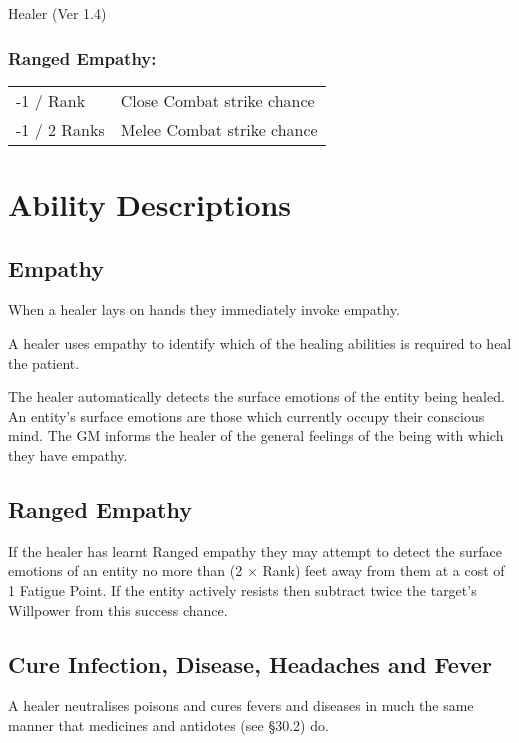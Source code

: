 \begin{Chapter}{Healer (Ver 1.4)}
\subsubsection{Ranged Empathy:}

\begin{tabularx}{\columnwidth}{ll}
-1 / Rank	& Close Combat strike chance \\
-1 / 2 Ranks	& Melee Combat strike chance \\
\end{tabularx}

\section{Ability Descriptions}

\subsection{Empathy}

When a healer lays on hands they immediately invoke empathy.

A healer uses empathy to identify which of the healing abilities is
required to heal the patient.

The healer automatically detects the surface emotions of the entity
being healed. An entity’s surface emotions are those which currently
occupy their conscious mind. The GM informs the healer of the general
feelings of the being with which they have empathy.

\subsection{Ranged Empathy}

If the healer has learnt Ranged empathy they may attempt to detect the
surface emotions of an entity no more than (2 × Rank) feet away from
them at a cost of 1 Fatigue Point. If the entity actively resists then
subtract twice the target’s Willpower from this success chance.

\subsection{Cure Infection, Disease, Headaches and Fever}

A healer neutralises poisons and cures fevers and diseases in much the
same manner that medicines and antidotes (see §30.2) do.


\end{Chapter}
